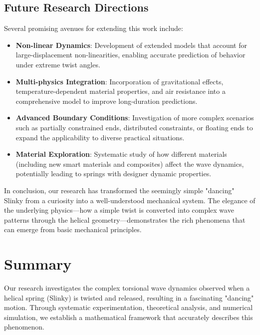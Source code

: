 \documentclass{mcmthesis}  %
\begin{document}
\subsection{Future Research Directions}
Several promising avenues for extending this work include:

\begin{itemize}
    \item \textbf{Non-linear Dynamics}: Development of extended models that account for large-displacement non-linearities, enabling accurate prediction of behavior under extreme twist angles.
    
    \item \textbf{Multi-physics Integration}: Incorporation of gravitational effects, temperature-dependent material properties, and air resistance into a comprehensive model to improve long-duration predictions.
    
    \item \textbf{Advanced Boundary Conditions}: Investigation of more complex scenarios such as partially constrained ends, distributed constraints, or floating ends to expand the applicability to diverse practical situations.
    
    \item \textbf{Material Exploration}: Systematic study of how different materials (including new smart materials and composites) affect the wave dynamics, potentially leading to springs with designer dynamic properties.
\end{itemize}

In conclusion, our research has transformed the seemingly simple "dancing" Slinky from a curiosity into a well-understood mechanical system. The elegance of the underlying physics—how a simple twist is converted into complex wave patterns through the helical geometry—demonstrates the rich phenomena that can emerge from basic mechanical principles.

\section{Summary}  %

Our research investigates the complex torsional wave dynamics observed when a helical spring (Slinky) is twisted and released, resulting in a fascinating "dancing" motion. Through systematic experimentation, theoretical analysis, and numerical simulation, we establish a mathematical framework that accurately describes this phenomenon. 
\end{document}

